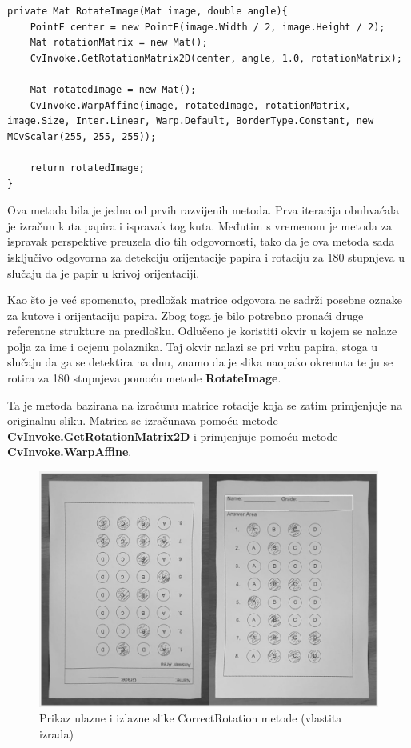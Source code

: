 \documentclass{foi}
\begin{document}
\pagebreak
\begin{lstlisting}[caption={Metoda za rotaciju slike}]
private Mat RotateImage(Mat image, double angle){
    PointF center = new PointF(image.Width / 2, image.Height / 2);
    Mat rotationMatrix = new Mat();
    CvInvoke.GetRotationMatrix2D(center, angle, 1.0, rotationMatrix);

    Mat rotatedImage = new Mat();
    CvInvoke.WarpAffine(image, rotatedImage, rotationMatrix, image.Size, Inter.Linear, Warp.Default, BorderType.Constant, new MCvScalar(255, 255, 255));

    return rotatedImage;
}
\end{lstlisting}

Ova metoda bila je jedna od prvih razvijenih metoda. Prva iteracija obuhvaćala je izračun kuta papira i ispravak tog kuta. Međutim s vremenom je metoda za ispravak perspektive preuzela dio tih odgovornosti, tako da je ova metoda sada isključivo odgovorna za detekciju orijentacije papira i rotaciju za 180 stupnjeva u slučaju da je papir u krivoj orijentaciji.

Kao što je već spomenuto, predložak matrice odgovora ne sadrži posebne oznake za kutove i orijentaciju papira. Zbog toga je bilo potrebno pronaći druge referentne strukture na predlošku. Odlučeno je koristiti okvir u kojem se nalaze polja za ime i ocjenu polaznika. Taj okvir nalazi se pri vrhu papira, stoga u slučaju da ga se detektira na dnu, znamo da je slika naopako okrenuta te ju se rotira za 180 stupnjeva pomoću metode \textbf{RotateImage}.

Ta je metoda bazirana na izračunu matrice rotacije koja se zatim primjenjuje na originalnu sliku. Matrica se izračunava pomoću metode \textbf{CvInvoke.GetRotationMatrix2D} i primjenjuje pomoću metode \textbf{CvInvoke.WarpAffine}.

\begin{figure}[H]
\centering
\includegraphics[width=0.7\linewidth]{slike/RotationComparison.png}
\caption{Prikaz ulazne i izlazne slike CorrectRotation metode (vlastita izrada)}
\end{figure}
\end{document}
